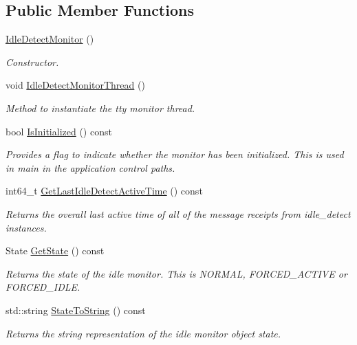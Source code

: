 \subsection*{Public Member Functions}
\begin{DoxyCompactItemize}
\item 
\mbox{\label{classEventDetect_1_1IdleDetectMonitor_aed0b4d13a0d9d3416fae76835f094d90}} 
\mbox{\hyperlink{classEventDetect_1_1IdleDetectMonitor_aed0b4d13a0d9d3416fae76835f094d90}{Idle\+Detect\+Monitor}} ()
\begin{DoxyCompactList}\small\item\em Constructor. \end{DoxyCompactList}\item 
\mbox{\label{classEventDetect_1_1IdleDetectMonitor_a03e59f3ae8ea4e93677f6684556d408f}} 
void \mbox{\hyperlink{classEventDetect_1_1IdleDetectMonitor_a03e59f3ae8ea4e93677f6684556d408f}{Idle\+Detect\+Monitor\+Thread}} ()
\begin{DoxyCompactList}\small\item\em Method to instantiate the tty monitor thread. \end{DoxyCompactList}\item 
bool \mbox{\hyperlink{classEventDetect_1_1IdleDetectMonitor_af945f0f33b8c0fe2c8ee33bd9ac83f12}{Is\+Initialized}} () const
\begin{DoxyCompactList}\small\item\em Provides a flag to indicate whether the monitor has been initialized. This is used in main in the application control paths. \end{DoxyCompactList}\item 
int64\+\_\+t \mbox{\hyperlink{classEventDetect_1_1IdleDetectMonitor_acc4bec04aa1e47e5e7e7fae87cdf2b76}{Get\+Last\+Idle\+Detect\+Active\+Time}} () const
\begin{DoxyCompactList}\small\item\em Returns the overall last active time of all of the message receipts from idle\+\_\+detect instances. \end{DoxyCompactList}\item 
State \mbox{\hyperlink{classEventDetect_1_1IdleDetectMonitor_a2f58fdfcded4906499db6f56dd4f036b}{Get\+State}} () const
\begin{DoxyCompactList}\small\item\em Returns the state of the idle monitor. This is N\+O\+R\+M\+AL, F\+O\+R\+C\+E\+D\+\_\+\+A\+C\+T\+I\+VE or F\+O\+R\+C\+E\+D\+\_\+\+I\+D\+LE. \end{DoxyCompactList}\item 
std\+::string \mbox{\hyperlink{classEventDetect_1_1IdleDetectMonitor_a0bad0433a375a2fa4d0a0e8c088a9922}{State\+To\+String}} () const
\begin{DoxyCompactList}\small\item\em Returns the string representation of the idle monitor object state. \end{DoxyCompactList}\end{DoxyCompactItemize}
